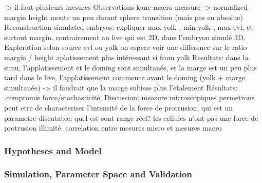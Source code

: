   -> il faut plusieurs mesures    Observations kane macro measure -> normalized margin height monte un peu durant sphere transition (mais pas en absolue)  Reconstruction simulated embryos:  expliquer max yolk , min yolk , max evl, et surtout margin. contrairement au live qui est 2D, dans l'embryon simulé 3D.  Exploration selon source evl ou yolk  on espere voir une difference sur le ratio margin / height  aplatissement plus intéressant si from yolk    Resultats:   dans la simu, l'applatissement et le doming sont simultanés, et la marge est un peu plus tard dans le live, l'applatissement commence avant le doming (yolk + marge simultanée)  -> il faudrait que la marge subisse plus l'etalement         Résultats:  .compromis force/stochasticité,      Discussion:  measure microscopiques permetrons peut etre de characteriser l'intensité de la force de protrusion, qui est un parametre discutable: quel est sont range réel? les cellules n'ont pas une force de protrusion illimité.  correlation entre mesures micro et mesures macro    

\subsubsection{Hypotheses and Model }

\subsubsection{Simulation, Parameter Space and Validation }

